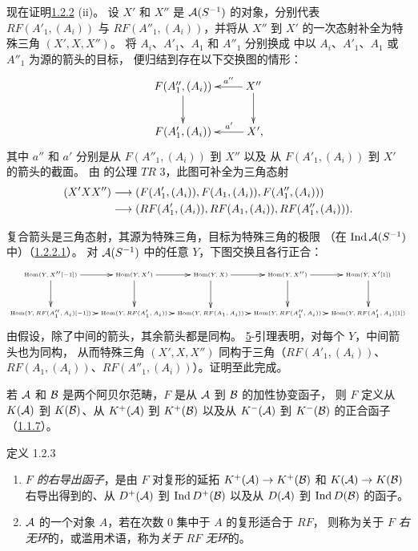 现在证明\pageoriginale \hyperref[XVII.prop1.2.2]{1.2.2} (ii)。
设 $X'$ 和 $X''$ 是 ${\mathcal A}(S^{-1})$ 的对象，分别代表 $RF(A'_1,(A_i))$
与 $RF(A''_1,(A_i))$，并将从 $X''$ 到 $X'$ 的一次态射补全为特殊三角 $(X',X,X'')$。
将 $A_i$、$A'_1$、$A_1$ 和 $A''_1$ 分别换成
 中以 $A_i$、$A'_1$、$A_1$ 或 $A''_1$ 为源的箭头的目标，
便归结到存在以下交换图的情形：
\[
\xymatrix{
F(A''_1, (A_i)) \ar[d] & X''  \ar[l]_-{a''} \ar[d]\\
F(A'_1, (A_i))    & X'  \ar[l]_-{a'}\rlap{,}
}
\]
其中 $a''$ 和 $a'$ 分别是从 $F(A''_1,(A_i))$ 到 $X''$ 以及
从 $F(A'_1,(A_i))$ 到 $X'$ 的箭头的截面。
由 \cite{sga4.exp.XVII.bib.CD} 的公理 $TR$ 3，此图可补全为三角态射
\begin{align*}
(X'XX'')& \longrightarrow
(F(A'_1,(A_i)),F(A_1,(A_i)),F(A''_1,(A_i)))\\
& \longrightarrow
(RF(A'_1,(A_i)),RF(A_1,(A_i)),RF(A''_1,(A_i))){}.
\end{align*}

复合箭头是三角态射，其源为特殊三角，目标为特殊三角的极限
（在 $\operatorname{Ind}{\mathcal A}(S^{-1})$ 中）（\hyperref[XVII.lem1.2.2.1]{1.2.2.1}）。
对 ${\mathcal A}(S^{-1})$ 中的任意 $Y$，下图交换且各行正合：
\[
\text{\tiny
$\xymatrix@C=0.5em{
\Hom\sisi{'}{(}Y, X''[\sisi{}{-}1]) \ar[r]\ar[d]& \Hom(Y,X') \ar[r] \ar[d]& \Hom(Y,X)
\ar[r]\ar[d]& \Hom(Y,X'') \ar[r] \ar[d]&
\Hom(Y,X'[1]) \ar[d]\\
\Hom(Y,RF(A''\sisi{}{_1},A_i)[\sisi{}{-}1])\ar[r] & \Hom(Y,RF(A'_1,A_i)\sisi{}{)}\ar[r] &  \Hom(Y,RF(A_1,A_i))\ar[r] &
\Hom(Y,RF(A''_1,A_i)\sisi{}{)}\ar[r] & \Hom(Y,RF(A'_1,A_i)[1])
}$}
\]
由\pageoriginale 假设，除了中间的箭头，其余箭头都是同构。
\hyperref[XVII.sec5]{5}-引理表明，对每个 $Y$，中间箭头也为同构，
从而特殊三角 $(X',X,X'')$ 同构于三角（$RF(A'_1,(A_i))$、
$RF(A_1,(A_i))$、$RF(A''_1,(A_i))$）。证明至此完成。

若 ${\mathcal A}$ 和 ${\mathcal B}$ 是两个阿贝尔范畴，$F$ 是从 ${\mathcal A}$ 到 ${\mathcal B}$ 的加性协变函子，
则 $F$ 定义从 $K({\mathcal A})$ 到 $K({\mathcal B})$、从 $K^{+}({\mathcal A})$ 到 $K^{+}({\mathcal B})$
以及从 $K^{-}({\mathcal A})$ 到 $K^{-}({\mathcal B})$ 的正合函子
（\hyperref[XVII.prop1.1.7]{1.1.7}）。

\begin{enonce*}{定义 1.2.3}
\begin{enumerate}
\renewcommand{\theenumi}{\roman{enumi}}
\renewcommand{\labelenumi}{(\theenumi)}
\item \emph{$F$ 的右导出函子}，是由 $F$ 对复形的延拓
$K^{+}({\mathcal A})\rightarrow K^{+}({\mathcal B})$ 和 $K({\mathcal A})\rightarrow K({\mathcal B})$
右导出得到的、从 $D^{+}({\mathcal A})$ 到 $\operatorname{Ind} D^{+}({\mathcal B})$
以及从 $D({\mathcal A})$ 到 $\operatorname{Ind} D({\mathcal B})$ 的函子。

\item ${\mathcal A}$ 的一个对象 $A$，若在次数 $0$ 集中于 $A$ 的复形适合于 $RF$，
则称为关于 $F$ \emph{右无环}的，或滥用术语，称为\emph{关于} $RF$ \emph{无环}的。
\end{enumerate}
\end{enonce*}

